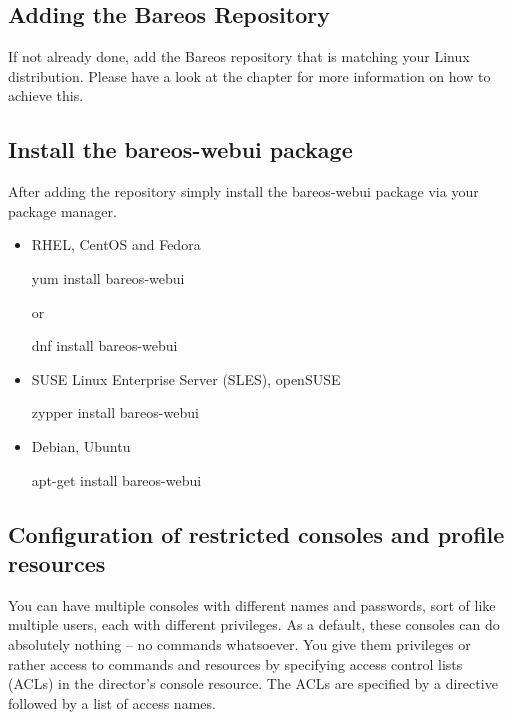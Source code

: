 \subsection{Adding the Bareos Repository}

If not already done, add the Bareos repository that is matching your Linux distribution. Please have a look at the chapter  for more information on how to achieve this.

\subsection{Install the bareos-webui package}

After adding the repository simply install the bareos-webui package via your package manager.

\begin{itemize}
 \item RHEL, CentOS and Fedora
\begin{commands}{}
yum install bareos-webui
\end{commands}
 or
\begin{commands}{}
dnf install bareos-webui
\end{commands}
\end{itemize}

\begin{itemize}
 \item SUSE Linux Enterprise Server (SLES), openSUSE
\begin{commands}{}
zypper install bareos-webui
\end{commands}
\end{itemize}

\begin{itemize}
 \item Debian, Ubuntu
\begin{commands}{}
apt-get install bareos-webui
\end{commands}
\end{itemize}


\subsection{Configuration of restricted consoles and profile resources}

You can have multiple consoles with different names and passwords, sort of like multiple users, each with different privileges. As a default, these consoles can do absolutely nothing – no commands whatsoever. You give them privileges or rather access to commands and resources by specifying access control lists (ACLs) in the director’s console resource. The ACLs are specified by a directive followed by a list of access names.

